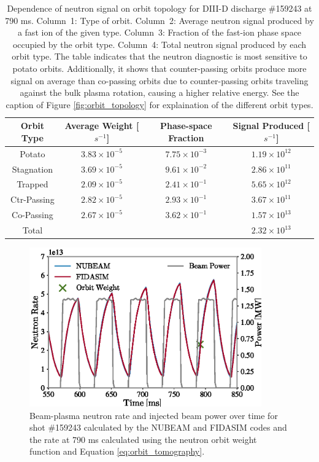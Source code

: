 \begin{table}[h!]
    \centering
    \begin{tabular}{|c|c|c|c|}
    \hline
    Orbit Type & Average Weight [$s^{-1}$] & Phase-space Fraction & Signal Produced [$s^{-1}$]\\
    \hline
    Potato      & $3.83\times10^{-5}$ & $7.75\times10^{-3}$ & $1.19\times10^{12}$  \\
    Stagnation  & $3.69\times10^{-5}$ & $9.61\times10^{-2}$ & $2.86\times10^{11}$  \\
    Trapped     & $2.09\times10^{-5}$ & $2.41\times10^{-1}$ & $5.65\times10^{12}$  \\
    Ctr-Passing & $2.82\times10^{-5}$ & $2.93\times10^{-1}$ & $3.67\times10^{11}$  \\
    Co-Passing  & $2.67\times10^{-5}$ & $3.62\times10^{-1}$ & $1.57\times10^{13}$  \\
    \hline
    Total       &                     &                     & $2.32\times10^{13}$  \\
    \hline
    \end{tabular}
    \caption{Dependence of neutron signal on orbit topology for DIII-D discharge \#159243 at 790 ms. Column~1: Type \cite{WHITE} of orbit. Column~2: Average neutron signal produced by a fast ion of the given type. Column~3: Fraction of the fast-ion phase space occupied by the orbit type. Column~4: Total neutron signal produced by each orbit type. The table indicates that the neutron diagnostic is most sensitive to potato orbits. Additionally, it shows that counter-passing orbits produce more signal on average than co-passing orbits due to counter-passing orbits traveling against the bulk plasma rotation, causing a higher relative energy. See the caption of Figure \ref{fig:orbit_topology} for explaination of the different orbit types.}
    \label{tab:neutron_orbit_weight}    
\end{table}
\begin{figure}[h!]
    \centering
    \includegraphics[width=10cm]{figures/neutron_rate.eps}
    \caption{Beam-plasma neutron rate and injected beam power over time for shot \#159243 calculated by the NUBEAM and FIDASIM codes and the rate at 790 ms calculated using the neutron orbit weight function and Equation \ref{eq:orbit_tomography}.}
    \label{fig:neutron_rate}
\end{figure}
